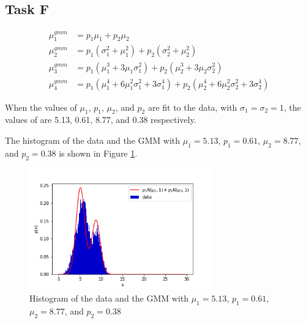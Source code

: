 \subsection{Task F}

\begin{align*}
    \mu_1^{gmm} &= p_1 \mu_1 + p_2 \mu_2 \\
    \mu_2^{gmm} &= p_1 (\sigma_1^2 + \mu_1^2 ) + p_2 (\sigma_2^2 + \mu_2^2) \\
    \mu_3^{gmm} &= p_1 (\mu_1^3 + 3\mu_1 \sigma_1^2 ) + p_2 (\mu_2^3 + 3\mu_2 \sigma_2^2) \\
    \mu_4^{gmm} &= p_1 (\mu_1^4 + 6\mu_1^2 \sigma_1^2 + 3\sigma_1^4 ) + p_2 (\mu_2^4 + 6\mu_2^2 \sigma_2^2 + 3\sigma_2^4)
\end{align*}

When the values of $\mu_1$, $p_1$, $\mu_2$, and $p_2$ are fit to the data, with $\sigma_1 = \sigma_2 = 1$, the values of are 5.13, 0.61, 8.77, and 0.38 respectively.

The histogram of the data and the GMM with $\mu_1=5.13$, $p_1=0.61$, $\mu_2=8.77$, and $p_2=0.38$ is shown in Figure \ref{fig:q3_hist_gmm}.

\begin{figure}[H]
    \centering
    \includegraphics[width=0.7\textwidth]{images/3f.png}
    \caption{Histogram of the data and the GMM with $\mu_1=5.13$, $p_1=0.61$, $\mu_2=8.77$, and $p_2=0.38$}
    \label{fig:q3_hist_gmm}
\end{figure}